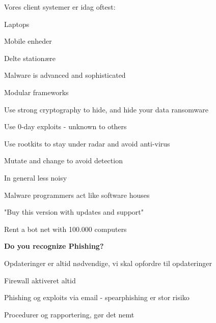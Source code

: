 \documentclass[20pt,landscape,a4paper,footrule]{foils}
\begin{document}
\begin{list1}
\item Vores client systemer er idag oftest:
\item Laptops
\item Mobile enheder
\item Delte stationære
\end{list1}


\begin{list1}
\item Malware is advanced and sophisticated
\item Modular frameworks
\item Use strong cryptography to hide, and hide your data ransomware
\item Use 0-day exploits - unknown to others
\item Use rootkits to stay under radar and avoid anti-virus
\item Mutate and change to avoid detection
\item In general less noisy
\end{list1}



\begin{list1}
\item Malware programmers act like software houses
\item "Buy this version with updates and support"
\item Rent a bot net with 100.000 computers
\end{list1}


\vskip 1cm
\centerline{\bf\LARGE Do you recognize Phishing?}




\begin{list1}
\item Opdateringer er altid nødvendige, vi skal opfordre til opdateringer
\item Firewall aktiveret altid
\item Phishing og exploits via email - spearphishing er stor risiko
\item Procedurer og rapportering, gør det nemt
\end{list1}
\end{document}
